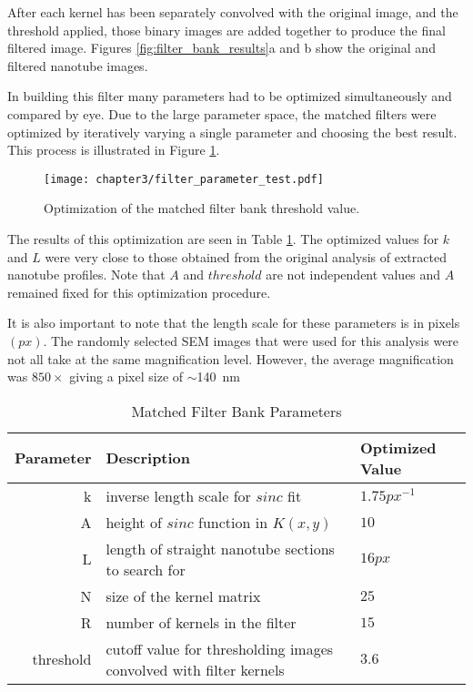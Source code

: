 After each kernel has been separately convolved with the original image, and the threshold applied, those binary images are added together to produce the final filtered image. Figures \ref{fig:filter_bank_results}a and b show the original and filtered nanotube images. 

In building this filter many parameters had to be optimized simultaneously and compared by eye. Due to the large parameter space, the matched filters were optimized by iteratively varying a single parameter and choosing the best result. This process is illustrated in Figure \ref{fig:filter_parameter_test}.

\begin{figure}
	\centering
	\texttt{[image: chapter3/filter\_parameter\_test.pdf]}
	\caption{Optimization of the matched filter bank threshold value.}
	\label{fig:filter_parameter_test}
\end{figure}

The results of this optimization are seen in Table \ref{table:filter_parameters}. The optimized values for $k$ and $L$ were very close to those obtained from the original analysis of extracted nanotube profiles. Note that $A$ and $threshold$ are not independent values and $A$ remained fixed for this optimization procedure. 

It is also important to note that the length scale for these parameters is in pixels $(px)$. The randomly selected SEM images that were used for this analysis were not all take at the same magnification level. However, the average magnification was $850\times$ giving a pixel size of $\sim$\SI{140}{\nano\meter}

\begin{table}
	\centering
	\caption{Matched Filter Bank Parameters}
    \begin{tabular}{| r | p{60mm} | l |}
    	\hline
    	\textbf{Parameter} & \textbf{Description} & \textbf{Optimized Value}  \\ \hline
    	k & inverse length scale for $sinc$ fit &  $1.75 px^{-1}$ \\ \hline
    	A & height of $sinc$ function in $K(x,y)$ &  $10$ \\ \hline
    	L & length of straight nanotube sections to search for &  $16 px$ \\ \hline
    	N & size of the kernel matrix &  $25$ \\ \hline
        R & number of kernels in the filter & $15$ \\ \hline
        threshold & cutoff value for thresholding images convolved with filter kernels & $3.6$ \\ \hline
    \end{tabular}
    \label{table:filter_parameters}
\end{table}


